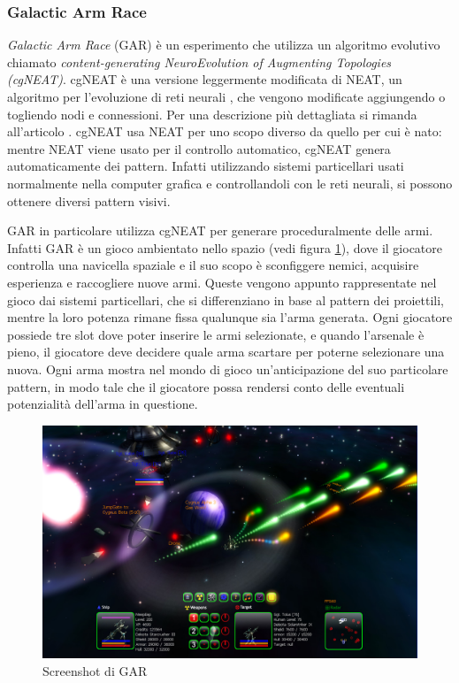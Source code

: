 \documentclass[12pt, italian]{toptesi}
\begin{document}
\subsubsection{Galactic Arm Race}

\emph{Galactic Arm Race} (GAR) \cite{gar:article} è un esperimento che utilizza un algoritmo evolutivo chiamato \emph{content-generating NeuroEvolution of Augmenting
Topologies (cgNEAT)}.
cgNEAT è una versione leggermente modificata di NEAT, un algoritmo per l'evoluzione di reti neurali , che vengono modificate aggiungendo o togliendo nodi e connessioni. Per una descrizione più dettagliata si rimanda all'articolo \cite{gar:article}.
cgNEAT usa NEAT per uno scopo diverso da quello per cui è nato: mentre NEAT viene usato per il controllo automatico, cgNEAT genera automaticamente dei pattern.
Infatti utilizzando sistemi particellari usati normalmente nella computer grafica e controllandoli con le reti neurali, si possono ottenere diversi pattern visivi.

GAR in particolare utilizza cgNEAT per generare proceduralmente delle armi. Infatti GAR è un gioco ambientato nello spazio (vedi figura \ref{fig:gar}), dove il giocatore controlla una navicella spaziale e il suo scopo è sconfiggere nemici, acquisire esperienza e raccogliere nuove armi. Queste vengono appunto rappresentate nel gioco dai sistemi particellari, che si differenziano in base al pattern dei proiettili, mentre la loro potenza rimane fissa qualunque sia l'arma generata.
Ogni giocatore possiede tre slot dove poter inserire le armi selezionate, e quando l'arsenale è pieno, il giocatore deve decidere quale arma scartare per poterne selezionare una nuova.
Ogni arma mostra nel mondo di gioco un'anticipazione del suo particolare pattern, in modo tale che il giocatore possa rendersi conto delle eventuali potenzialità dell'arma in questione.

\begin{figure}
\centering
\includegraphics[width=1.0\textwidth]{GAR}
\caption{Screenshot di GAR}
\label{fig:gar}
\end{figure}
\end{document}
